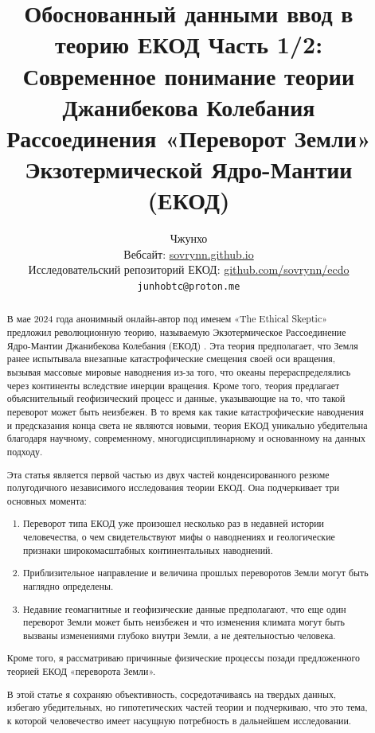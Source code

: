 \documentclass[10pt,twocolumn,letterpaper]{article}
\begin{document}
\title{Обоснованный данными ввод в теорию ЕКОД Часть 1/2: Современное понимание теории Джанибекова Колебания Рассоединения «Переворот Земли» Экзотермической Ядро-Мантии (ЕКОД)}

\author{Чжунхо\\
Вебсайт: \href{https://sovrynn.github.io}{sovrynn.github.io}\\
Исследовательский репозиторий ЕКОД: \href{https://github.com/sovrynn/ecdo}{github.com/sovrynn/ecdo}\\
{\tt\small junhobtc@proton.me}
}

\maketitle

\begin{abstract}
В мае 2024 года анонимный онлайн-автор под именем «The Ethical Skeptic» \cite{0} предложил революционную теорию, называемую Экзотермическое Рассоединение Ядро-Мантии Джанибекова Колебания (ЕКОД) \cite{1}. Эта теория предполагает, что Земля ранее испытывала внезапные катастрофические смещения своей оси вращения, вызывая массовые мировые наводнения из-за того, что океаны перераспределялись через континенты вследствие инерции вращения. Кроме того, теория предлагает объяснительный геофизический процесс и данные, указывающие на то, что такой переворот может быть неизбежен. В то время как такие катастрофические наводнения и предсказания конца света не являются новыми, теория ЕКОД уникально убедительна благодаря научному, современному, многодисциплинарному и основанному на данных подходу.

Эта статья является первой частью из двух частей конденсированного резюме полугодичного независимого исследования \cite{2,20} теории ЕКОД. Она подчеркивает три основных момента:

\begin{flushleft}
\begin{enumerate}
    \item Переворот типа ЕКОД уже произошел несколько раз в недавней истории человечества, о чем свидетельствуют мифы о наводнениях и геологические признаки широкомасштабных континентальных наводнений.
    \item Приблизительное направление и величина прошлых переворотов Земли могут быть наглядно определены.
    \item Недавние геомагнитные и геофизические данные предполагают, что еще один переворот Земли может быть неизбежен и что изменения климата могут быть вызваны изменениями глубоко внутри Земли, а не деятельностью человека.
\end{enumerate}
\end{flushleft}

Кроме того, я рассматриваю причинные физические процессы позади предложенного теорией ЕКОД «переворота Земли».

В этой статье я сохраняю объективность, сосредотачиваясь на твердых данных, избегаю убедительных, но гипотетических частей теории и подчеркиваю, что это тема, к которой человечество имеет насущную потребность в дальнейшем исследовании.
\end{abstract}
\end{document}
